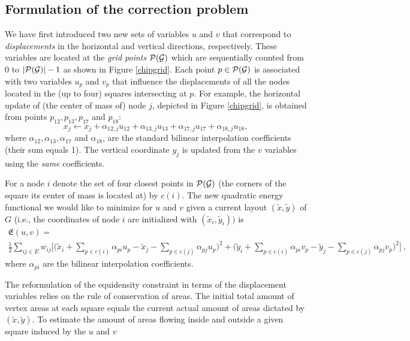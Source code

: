 \documentclass[final]{siamltex}
\begin{document}
\subsection{Formulation of the correction problem}\label{sProbRef}
\par We have first introduced two new sets of variables $u$ and $v$ that correspond to {\it displacements}
 in the horizontal
 and vertical directions, respectively. These variables are located at the {\it grid points} $\mathcal{P}(\mathcal{G})$
which are sequentially counted from $0$ to $|\mathcal{P}(\mathcal{G})|-1$ as shown in Figure \ref{chipgrid}.
 Each point $p\in \mathcal{P}(\mathcal{G})$ is associated with two variables $u_p$ and $v_p$ that influence the
 displacements
 of all the nodes located in the (up to four) squares intersecting at $p$.
 For example, the horizontal update of (the center of mass of) node $j$,
 depicted in Figure \ref{chipgrid}, is obtained
 from points $p_{12}, p_{13}, p_{17}$ and $p_{18}$:
\[
x_j\leftarrow
x_j+\alpha_{12,j}u_{12}+\alpha_{13,j}u_{13}+\alpha_{17,j}u_{17}+\alpha_{18,j}u_{18},
\]
where $\alpha_{12},\alpha_{13},\alpha_{17}$ and $\alpha_{18}$, are
the standard bilinear interpolation coefficients (their sum equals
1). The vertical coordinate $y_j$ is updated from the $v$
variables using the {\it same} coefficients.
\par For a node $i$ denote the
set of four closest points in $\mathcal{P}(\mathcal{G})$ (the corners of the square
its center of mass is located at) by $c(i)$.
The new quadratic energy functional we
would like to minimize for $u$ and $v$ given a current layout
$(\tilde{x},\tilde{y})$ of $G$ (i.e., the coordinates of node $i$
are initialized with $(\tilde{x}_i,\tilde{y}_i))$ is
\begin{multline}\label{min-func}
\mathfrak{E}(u, v) = \\
\frac{1}{2}\sum_{ij\in E} w_{ij} \biggl[ \biggl( \tilde{x}_i +
\sum_{p\in c(i)}\alpha_{pi} u_p - \tilde{x}_j - \sum_{p\in
c(j)}\alpha_{pj} u_p\biggr) ^2 + \biggr(\tilde{y}_i + \sum_{p\in
c(i)}\alpha_{pi} v_p - \tilde{y}_j - \sum_{p\in c(j)}\alpha_{pj}
v_p\biggr)^2 \biggr]~,
\end{multline}
where $\alpha_{pi}$ are the bilinear interpolation
coefficients.
\par The reformulation of the equidensity constraint in
terms of the displacement variables relies on the rule of
conservation of areas. The initial total amount of vertex areas at
each square equals the current actual amount of areas dictated by
$(\tilde{x},\tilde{y})$. To estimate the amount of areas flowing
inside and outside a given square induced by the $u$ and $v$
\end{document}

